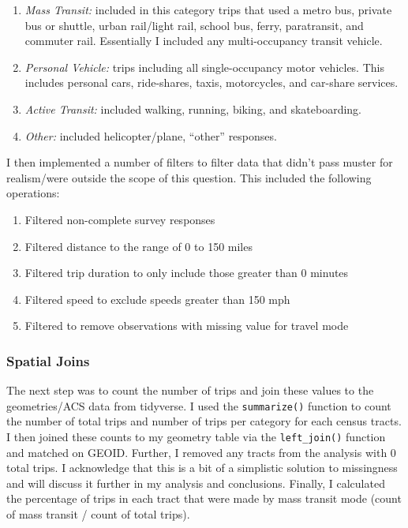 \documentclass[
]{article}
\providecommand{\tightlist}{%
  \setlength{\itemsep}{0pt}\setlength{\parskip}{0pt}}
\begin{document}
\begin{enumerate}
\def\labelenumi{\arabic{enumi}.}
\tightlist
\item
  \emph{Mass Transit:} included in this category trips that used a metro
  bus, private bus or shuttle, urban rail/light rail, school bus, ferry,
  paratransit, and commuter rail. Essentially I included any
  multi-occupancy transit vehicle.
\item
  \emph{Personal Vehicle:} trips including all single-occupancy motor
  vehicles. This includes personal cars, ride-shares, taxis,
  motorcycles, and car-share services.
\item
  \emph{Active Transit:} included walking, running, biking, and
  skateboarding.
\item
  \emph{Other:} included helicopter/plane, ``other'' responses.
\end{enumerate}

I then implemented a number of filters to filter data that didn't pass
muster for realism/were outside the scope of this question. This
included the following operations:

\begin{enumerate}
\def\labelenumi{\arabic{enumi}.}
\tightlist
\item
  Filtered non-complete survey responses
\item
  Filtered distance to the range of 0 to 150 miles
\item
  Filtered trip duration to only include those greater than 0 minutes
\item
  Filtered speed to exclude speeds greater than 150 mph
\item
  Filtered to remove observations with missing value for travel mode
\end{enumerate}

\subsubsection{Spatial Joins}\label{spatial-joins}

The next step was to count the number of trips and join these values to
the geometries/ACS data from tidyverse. I used the \texttt{summarize()}
function to count the number of total trips and number of trips per
category for each census tracts. I then joined these counts to my
geometry table via the \texttt{left\_join()} function and matched on
GEOID. Further, I removed any tracts from the analysis with 0 total
trips. I acknowledge that this is a bit of a simplistic solution to
missingness and will discuss it further in my analysis and conclusions.
Finally, I calculated the percentage of trips in each tract that were
made by mass transit mode (count of mass transit / count of total
trips).
\end{document}
